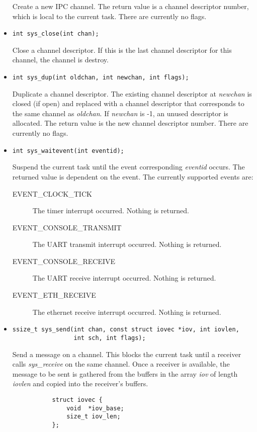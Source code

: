 \documentclass[letterpaper]{article}
\begin{document}
\begin{itemize}
Create a new IPC channel. The return value is a channel descriptor number, which
is local to the current task. There are currently no flags.
\item \begin{verbatim}int sys_close(int chan);\end{verbatim}
Close a channel descriptor. If this is the last channel descriptor for
this channel, the channel is destroy.
\item \begin{verbatim}int sys_dup(int oldchan, int newchan, int flags);\end{verbatim}
Duplicate a channel descriptor. The existing channel descriptor at \emph{newchan} is closed (if open) and replaced with a channel
descriptor that corresponds to the same channel as \emph{oldchan}. If \emph{newchan} is -1, an unused
descriptor is allocated. The return value is the new channel descriptor number. There are currently no flags.
\item \begin{verbatim}int sys_waitevent(int eventid);\end{verbatim}
Suspend the current task until the event corresponding \emph{eventid} occurs. The returned value
is dependent on the event. The currently supported events are:
\begin{description}
\item[EVENT\_CLOCK\_TICK] The timer interrupt occurred. Nothing is returned.
\item[EVENT\_CONSOLE\_TRANSMIT] The UART transmit interrupt occurred. Nothing is returned.
\item[EVENT\_CONSOLE\_RECEIVE] The UART receive interrupt occurred. Nothing is returned.
\item[EVENT\_ETH\_RECEIVE] The ethernet receive interrupt occurred. Nothing is returned.
\end{description}

\item \begin{verbatim}
ssize_t sys_send(int chan, const struct iovec *iov, int iovlen,
                 int sch, int flags);\end{verbatim}
	Send a message on a channel. This blocks the current task until a receiver calls \emph{sys\_receive} on the
	same channel. Once a receiver is available, the message to be sent is gathered from the buffers in the array
	\emph{iov} of length \emph{iovlen} and copied into the receiver's buffers.

	\begin{verbatim}
           struct iovec {
               void  *iov_base;
               size_t iov_len;
           };
	\end{verbatim}


\end{itemize}
\end{document}

